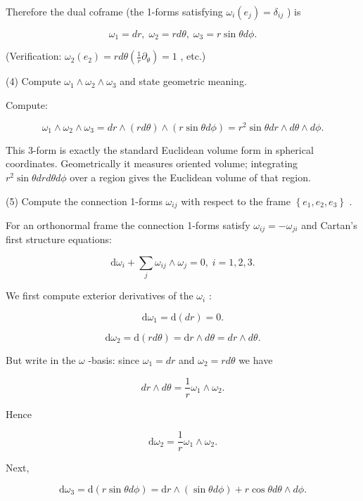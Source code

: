 \documentclass[10pt]{article}
\begin{document}
Therefore the dual coframe (the 1-forms satisfying \({\omega }_{i}\left( {e}_{j}\right)  = {\delta }_{ij}\) ) is

\[
{\omega }_{1} = {dr},\;{\omega }_{2} = {rd\theta },\;{\omega }_{3} = r\sin {\theta d\phi }.
\]

(Verification: \({\omega }_{2}\left( {e}_{2}\right)  = {rd\theta }\left( {\frac{1}{r}{\partial }_{\theta }}\right)  = 1\) , etc.)

(4) Compute \({\omega }_{1} \land  {\omega }_{2} \land  {\omega }_{3}\) and state geometric meaning.

Compute:

\[
{\omega }_{1} \land  {\omega }_{2} \land  {\omega }_{3} = {dr} \land  \left( {rd\theta }\right)  \land  \left( {r\sin {\theta d\phi }}\right)  = {r}^{2}\sin {\theta dr} \land  {d\theta } \land  {d\phi }.
\]

This 3-form is exactly the standard Euclidean volume form in spherical coordinates. Geometrically it measures oriented volume; integrating \({r}^{2}\sin {\theta drd\theta d\phi }\) over a region gives the Euclidean volume of that region.

(5) Compute the connection 1-forms \({\omega }_{ij}\) with respect to the frame \(\left\{  {{e}_{1},{e}_{2},{e}_{3}}\right\}\) .

For an orthonormal frame the connection 1-forms satisfy \({\omega }_{ij} =  - {\omega }_{ji}\) and Cartan’s first structure equations:

\[
\mathrm{d}{\omega }_{i} + \mathop{\sum }\limits_{j}{\omega }_{ij} \land  {\omega }_{j} = 0,\;i = 1,2,3.
\]

We first compute exterior derivatives of the \({\omega }_{i}\) :

\[
\mathrm{d}{\omega }_{1} = \mathrm{d}\left( {dr}\right)  = 0.
\]

\[
\mathrm{d}{\omega }_{2} = \mathrm{d}\left( {rd\theta }\right)  = \mathrm{d}r \land  {d\theta } = {dr} \land  {d\theta }.
\]

But write in the \(\omega\) -basis: since \({\omega }_{1} = {dr}\) and \({\omega }_{2} = {rd\theta }\) we have

\[
{dr} \land  {d\theta } = \frac{1}{r}{\omega }_{1} \land  {\omega }_{2}.
\]

Hence

\[
\mathrm{d}{\omega }_{2} = \frac{1}{r}{\omega }_{1} \land  {\omega }_{2}.
\]

Next,

\[
\mathrm{d}{\omega }_{3} = \mathrm{d}\left( {r\sin {\theta d\phi }}\right)  = \mathrm{d}r \land  \left( {\sin {\theta d\phi }}\right)  + r\cos {\theta d\theta } \land  {d\phi }.
\]
\end{document}
